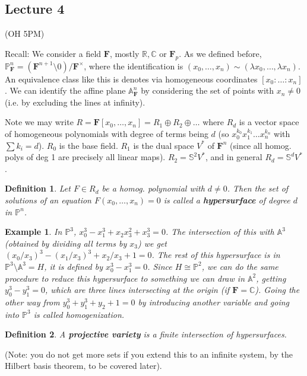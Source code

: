 \documentclass[12pt]{article}
\newcommand{\F}{\mathbf{F}}
\newcommand{\C}{\mathbb{C}}
\newcommand{\R}{\mathbb{R}}
\renewcommand{\P}{\mathbb{P}}
\newcommand{\A}{\mathbb{A}}
\newtheorem{definition}{Definition}
\newtheorem{example}[]{Example}
\begin{document}
    \subsection{Lecture 4}
    (OH 5PM) \par 
    [TODO: there are some errors in this lecture] \par
    Recall: We consider a field $\F$, mostly $\R, \C$ or $\F_p$. As we defined before, $\P_\F^n = (\F^{n+1} \setminus 0)/\F^\times$, where the identification is $(x_0, \dots, x_n) \sim (\lambda x_0, \dots, \lambda x_n)$. An equivalence class like this is denotes via homogeneous coordinates $[x_0: \dots : x_n]$. We can identify the affine plane $\A_\F^n$ by considering the set of points with $x_n \neq 0$ (i.e. by excluding the lines at infinity). \par 
    Note we may write $R = \F[x_0, \dots, x_n] = R_1 \oplus R_2 \oplus \dots$ where $R_d$ is a vector space of homogeneous polynomials with degree of terms being $d$ (so $x_0^{k_0}x_1^{k_1} \dots x_n^{k_n}$ with $\sum k_i = d$). $R_0$ is the base field. $R_1$ is the dual space $V^*$ of $\F^n$ (since all homog. polys of deg 1 are precisely all linear maps). $R_2 = \mathbb{S}^2 V^*$, and in general $R_d = \mathbb{S}^d V^*$. 
    \begin{definition}
        Let $F \in R_d$ be a homog. polynomial with $d \neq 0$. Then the set of solutions of an equation $F(x_0, \dots, x_n) = 0$ is called a \textbf{hypersurface} of degree $d$ in $\P^n$.  
    \end{definition}
    \begin{example}
        In $\P^3$, $x_0^3 - x_1^3 + x_2x_3^2 + x_3^3 = 0$. The intersection of this with $\A^3$ (obtained by dividing all terms by $x_3$) we get $(x_0/x_3)^3 - (x_1/x_3)^3 + x_2/x_3 + 1 = 0$. The rest of this hypersurface is in $\P^3 \setminus \A^3 = H$, it is defined by $x_0^3 - x_1^3 = 0$. Since $H \cong \P^2$, we can do the same procedure to reduce this hypersurface to something we can draw in $\A^2$, getting $y_0^3 - y_1^3 = 0$, which are three lines intersecting at the origin (if $\F = \C$). Going the other way from $y_0^3 + y_1^3 + y_2 + 1 = 0$ by introducing another variable and going into $\P^3$ is called \textit{homogenization}. 
    \end{example}
    \begin{definition}
        A \textbf{projective variety} is a \textit{finite} intersection of hypersurfaces. 
    \end{definition}
    (Note: you do not get more sets if you extend this to an infinite system, by the Hilbert basis theorem, to be covered later). \par 
\end{document}
